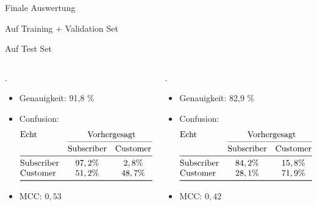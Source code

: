 \begin{frame}{Finale Auswertung}

{
 Auf Training + Validation Set

 Auf Test Set
}

\begin{columns}
\begin{column}{0.5\textwidth}
{
.
\begin{itemize}
\item Genauigkeit: 91,8 \%
\item Confusion:
\[
\begin{array}{@{}l*{5}{c}@{}}
\text{Echt} & \multicolumn{2}{c@{}}{\text{Vorhergesagt}}\\
    \cmidrule(l){2-3}
    & \text{Subscriber} & \text{Customer}\\
\midrule
\text{Subscriber} & 97,2 \% & 2,8 \% \\
\text{Customer}   & 51,2 \% & 48,7 \% \\
\bottomrule
\end{array}
\]
\item MCC: $0,53$
\end{itemize}
}
\end{column}
\begin{column}{0.5\textwidth}
{
.
\begin{itemize}
\item Genauigkeit: 82,9 \%
\item Confusion:
\[
\begin{array}{@{}l*{5}{c}@{}}
\text{Echt} & \multicolumn{2}{c@{}}{\text{Vorhergesagt}}\\
    \cmidrule(l){2-3}
    & \text{Subscriber} & \text{Customer}\\
\midrule
\text{Subscriber} & 84,2 \% & 15,8 \% \\
\text{Customer}   & 28,1 \% & 71,9 \% \\
\bottomrule
\end{array}
\]
\item MCC: $0,42$
\end{itemize}
}
\end{column}
\end{columns}
\end{frame}


